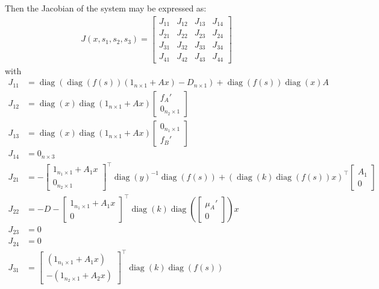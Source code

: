 \documentclass[3p,times]{article}
\DeclareMathOperator{\diag}{diag}
\begin{document}
Then the Jacobian of the system may be expressed as:
\begin{align}
\label{Jacobian_system}
 J(x,s_1,s_2,s_3) = \begin{bmatrix}
J_{11} & J_{12} & J_{13} & J_{14} \\
J_{21} & J_{22} & J_{23} & J_{24} \\
J_{31} & J_{32} & J_{33} & J_{34} \\
J_{41} & J_{42} & J_{43} & J_{44} 
\end{bmatrix} 
\end{align} 
with 
\begin{align}
J_{11} &=  \diag(\diag(f(s))(1_{n\times 1} +Ax)-D_{n\times 1})
+\diag(f(s))\diag(x)A \\
J_{12} &= \diag(x)\diag(1_{n \times 1}+Ax)\begin{bmatrix} f_A' \\ 0_{n_2 \times 1} \end{bmatrix}  \\
J_{13} &=\diag(x)\diag(1_{n\times 1}+Ax)\begin{bmatrix} 0_{n_1 \times 1} \\ f_B' \end{bmatrix} \\
J_{14} &= 0_{n\times 3}\\
J_{21} &= -\begin{bmatrix}
1_{n_1 \times 1} + A_1 x \\ 0_{n_2 \times 1} \end{bmatrix}^\top \diag(y)^{-1} \diag (f(s))  + (\diag(k)\diag(f(s))x)^\top\begin{bmatrix} A_1 \\ 0 \end{bmatrix}  \\
J_{22} &= -D  - \begin{bmatrix} 1_{n_1 \times 1} + A_1x \\ 0 \end{bmatrix}^\top \diag(k) \diag\left( \begin{bmatrix}\mu_A' \\ 0 \end{bmatrix}\right)x \\
J_{23} & = 0 \\
J_{24} &= 0 \\
J_{31} &= \begin{bmatrix} \left(1_{n_1 \times 1}+A_1x \right)\\ - \left(1_{n_2 \times 1} + A_2x \right)  \end{bmatrix}^\top \diag(k) \diag(f(s)) 

\end{align}
\end{document}
